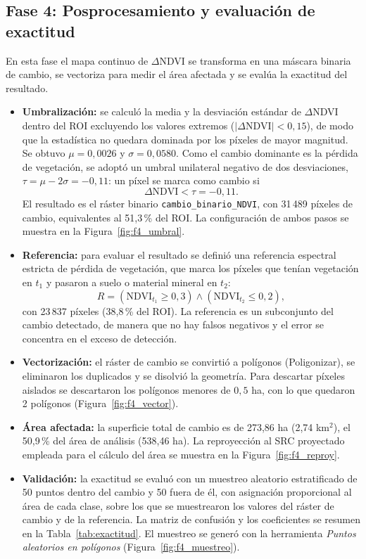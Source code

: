 \documentclass[12pt]{article}
\begin{document}
\subsection{Fase 4: Posprocesamiento y evaluación de exactitud}
En esta fase el mapa continuo de $\Delta$NDVI se transforma en una máscara binaria de cambio, se vectoriza para medir el área afectada y se evalúa la exactitud del resultado.
\begin{itemize}
    \item \textbf{Umbralización:} se calculó la media y la desviación estándar de $\Delta$NDVI dentro del ROI excluyendo los valores extremos ($|\Delta\mathrm{NDVI}|<0{,}15$), de modo que la estadística no quedara dominada por los píxeles de mayor magnitud. Se obtuvo $\mu=0{,}0026$ y $\sigma=0{,}0580$. Como el cambio dominante es la pérdida de vegetación, se adoptó un umbral unilateral negativo de dos desviaciones, $\tau=\mu-2\sigma=-0{,}11$: un píxel se marca como cambio si
    \begin{equation}
     \Delta\mathrm{NDVI} < \tau = -0{,}11 .
    \end{equation}
    El resultado es el ráster binario \texttt{cambio\_binario\_NDVI}, con 31\,489 píxeles de cambio, equivalentes al 51{,}3\,\% del ROI. La configuración de ambos pasos se muestra en la Figura~\ref{fig:f4_umbral}.
    \item \textbf{Referencia:} para evaluar el resultado se definió una referencia espectral estricta de pérdida de vegetación, que marca los píxeles que tenían vegetación en $t_1$ y pasaron a suelo o material mineral en $t_2$:
    \begin{equation}
     R = (\mathrm{NDVI}_{t_1} \ge 0{,}3) \land (\mathrm{NDVI}_{t_2} \le 0{,}2),
    \end{equation}
    con 23\,837 píxeles (38{,}8\,\% del ROI). La referencia es un subconjunto del cambio detectado, de manera que no hay falsos negativos y el error se concentra en el exceso de detección.
    \item \textbf{Vectorización:} el ráster de cambio se convirtió a polígonos (Poligonizar), se eliminaron los duplicados y se disolvió la geometría. Para descartar píxeles aislados se descartaron los polígonos menores de $0{,}5$ ha, con lo que quedaron 2 polígonos (Figura~\ref{fig:f4_vector}).
    \item \textbf{Área afectada:} la superficie total de cambio es de 273{,}86 ha (2{,}74 km$^2$), el 50{,}9\,\% del área de análisis (538{,}46 ha). La reproyección al SRC proyectado empleada para el cálculo del área se muestra en la Figura~\ref{fig:f4_reproy}.
    \item \textbf{Validación:} la exactitud se evaluó con un muestreo aleatorio estratificado de 50 puntos dentro del cambio y 50 fuera de él, con asignación proporcional al área de cada clase, sobre los que se muestrearon los valores del ráster de cambio y de la referencia. La matriz de confusión y los coeficientes se resumen en la Tabla~\ref{tab:exactitud}. El muestreo se generó con la herramienta \emph{Puntos aleatorios en polígonos} (Figura~\ref{fig:f4_muestreo}).
\end{itemize}
\end{document}
